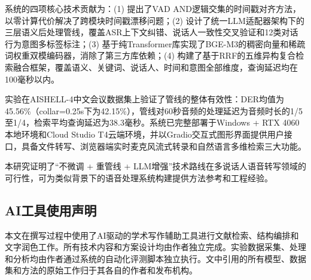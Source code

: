 \documentclass[12pt, a4paper]{article}
\begin{document}
系统的四项核心技术贡献为：(1) 提出了VAD AND逻辑交集的时间戳对齐方法，以零计算代价解决了跨模块时间戳漂移问题；(2) 设计了统一LLM适配器架构下的三层语义后处理管线，覆盖ASR上下文纠错、说话人一致性交叉验证和12类对话行为意图多标签标注；(3) 基于纯Transformer库实现了BGE-M3的稠密向量和稀疏词权重双模编码器，消除了第三方库依赖；(4) 构建了基于RRF的五维异构复合检索融合框架，覆盖语义、关键词、说话人、时间和意图全部维度，查询延迟均在100毫秒以内。

实验在AISHELL-4中文会议数据集上验证了管线的整体有效性：DER均值为45.56\%（collar=0.25s下为42.15\%），管线对60秒音频的处理延迟为音频时长的1/5至1/4，检索平均查询延迟为38.3毫秒。系统已完整部署于Windows + RTX 4060本地环境和Cloud Studio T4云端环境，并以Gradio交互式图形界面提供用户接口，具备文件转写、浏览器端实时麦克风流式转录和自然语言多维检索三大功能。

本研究证明了``不微调 + 重管线 + LLM增强''技术路线在多说话人语音转写领域的可行性，可为类似背景下的语音处理系统构建提供方法参考和工程经验。

\subsection*{AI工具使用声明}
本文在撰写过程中使用了AI驱动的学术写作辅助工具进行文献检索、结构编排和文字润色工作。所有技术内容和方案设计均由作者独立完成。实验数据采集、处理和分析均由作者通过系统的自动化评测脚本独立执行。文中引用的所有模型、数据集和方法的原始工作归于其各自的作者和发布机构。

\newpage

\end{document}
